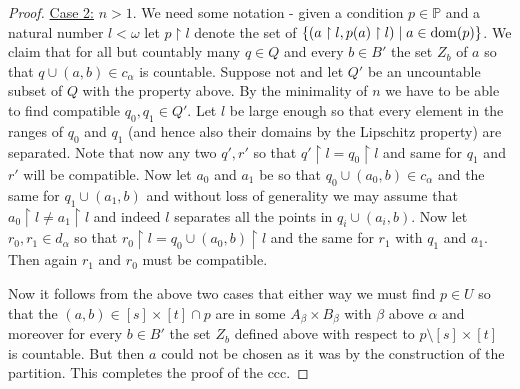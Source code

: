 \documentclass[leqno,11pt]{amsart}
\theoremstyle{definition}
\theoremstyle{remark}
\def\hook{\upharpoonright}
\def\P{\mathbb P}
\begin{document}
\begin{proof}
    \noindent \underline{Case 2:} $n > 1$. We need some notation - given a condition $p \in \P$ and a natural number $l < \omega$ let $p \hook l$ denote the set of $\{(a \hook l, p(a) \hook l)\; | \; a \in {\rm dom}(p)\}$. We claim that for all but countably many $q \in Q$ and every $b \in B'$ the set $Z_b$ of $a$ so that $q \cup (a, b) \in c_\alpha$ is countable. Suppose not and let $Q'$ be an uncountable subset of $Q$ with the property above. By the minimality of $n$ we have to be able to find compatible $q_0, q_1 \in Q'$. Let $l$ be large enough so that every element in the ranges of $q_0$ and $q_1$ (and hence also their domains by the Lipschitz property) are separated. Note that now any two $q', r'$ so that $q' \hook l = q_0 \hook l$ and same for $q_1$ and $r'$ will be compatible. Now let $a_0$ and $a_1$ be so that $q_0 \cup (a_0, b) \in c_\alpha$ and the same for $q_1 \cup (a_1, b)$ and without loss of generality we may assume that $a_0 \hook l  \neq a_1 \hook l$ and indeed $l$ separates all the points in $q_i \cup (a_i, b)$. Now let $r_0, r_1 \in d_\alpha$ so that $r_0 \hook l = q_0 \cup (a_0, b) \hook l$ and the same for $r_1$ with $q_1$ and $a_1$. Then again $r_1$ and $r_0$ must be compatible. 

Now it follows from the above two cases that either way we must find $p \in U$ so that the $(a, b) \in [s]\times[t] \cap p$ are in some $A_\beta \times B_\beta$ with $\beta$ above $\alpha$ and moreover for every $b \in B'$ the set $Z_b$ defined above with respect to $p \setminus [s] \times [t]$ is countable. But then $a$ could not be chosen as it was by the construction of the partition. This completes the proof of the ccc.


\end{proof}
\end{document}
